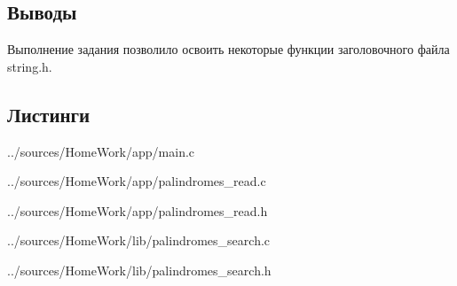 \documentclass[12pt,a4paper]{report}
\begin{document}
\subsection{Выводы}
Выполнение задания позволило освоить некоторые функции заголовочного файла string.h.

\subsection*{Листинги}

{../sources/HomeWork/app/main.c}


{../sources/HomeWork/app/palindromes_read.c}


{../sources/HomeWork/app/palindromes_read.h}


{../sources/HomeWork/lib/palindromes_search.c}


{../sources/HomeWork/lib/palindromes_search.h}
\end{document}
